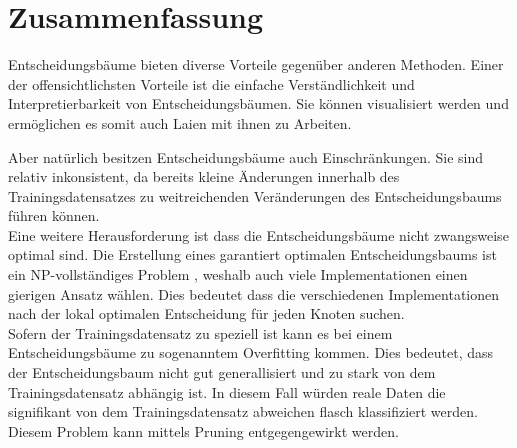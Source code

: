 \chapter{Zusammenfassung}
\label{zusammenfassung}

Entscheidungsbäume bieten diverse Vorteile gegenüber anderen Methoden. Einer der offensichtlichsten Vorteile ist die einfache Verständlichkeit und Interpretierbarkeit von Entscheidungsbäumen. \autocite{DataMining} Sie können visualisiert werden und ermöglichen es somit auch Laien mit ihnen zu Arbeiten. \autocite{Decision46:online} 


Aber natürlich besitzen Entscheidungsbäume auch Einschränkungen. Sie sind relativ inkonsistent, da bereits kleine Änderungen innerhalb des Trainingsdatensatzes zu weitreichenden Veränderungen des Entscheidungsbaums führen können. \autocite{Decision46:online}\\
Eine weitere Herausforderung ist dass die Entscheidungsbäume nicht zwangsweise optimal sind. Die Erstellung eines garantiert optimalen Entscheidungsbaums ist ein NP-vollständiges Problem \autocite{DataMining}, weshalb auch viele Implementationen einen gierigen Ansatz wählen. Dies bedeutet dass die verschiedenen Implementationen nach der lokal optimalen Entscheidung für jeden Knoten suchen. \autocite{Decision46:online}\\
Sofern der Trainingsdatensatz zu speziell ist kann es bei einem Entscheidungsbäume zu sogenanntem Overfitting kommen. Dies bedeutet, dass der Entscheidungsbaum nicht gut generallisiert und zu stark von dem Trainingsdatensatz abhängig ist. In diesem Fall würden reale Daten die signifikant von dem Trainingsdatensatz abweichen flasch klassifiziert werden. \autocite{DataMining} Diesem Problem kann mittels Pruning entgegengewirkt werden.